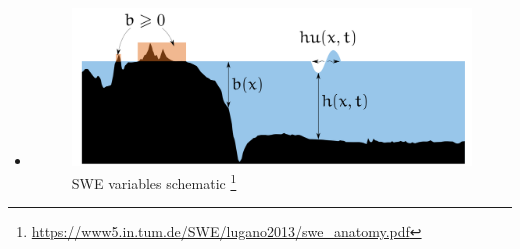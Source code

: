 \begin{frame}
\begin{multicols}{2}
\begin{itemize}
\begin{itemize}
\end{itemize}
    \vfill\columnbreak
    \vspace*{0.39cm}
\item<1->[]
\begin{figure}
\includegraphics[width=\columnwidth, height=.4\textheight]{./Resources/Images/swe.png}%
\caption{SWE variables schematic \footnote{\url{https://www5.in.tum.de/SWE/lugano2013/swe_anatomy.pdf}}}
\end{figure}
\end{itemize}
\end{multicols}
\end{frame}
\clearpage


